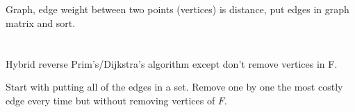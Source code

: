 \documentclass[11pt,letterpaper]{article}
\begin{document}
	\section{}
		Graph, edge weight between two points (vertices) is distance, put edges in graph matrix and sort.
		
	\section{}
		Hybrid reverse Prim's/Dijkstra's algorithm except don't remove vertices in F.
		
		Start with putting all of the edges in a set. Remove one by one the most costly edge every time but without removing vertices of $F$.
	
\end{document}
